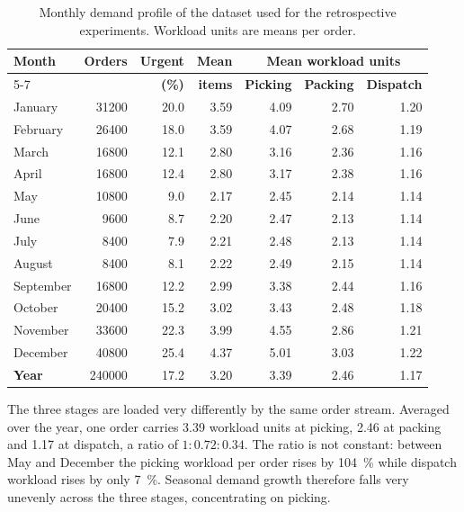 \begin{table}[htbp]
\centering
\caption[Monthly demand profile]{Monthly demand profile of the dataset used for the
retrospective experiments. Workload units are means per order.}
\label{tab:demand-profile}
\small
\begin{tabular}{lrrrrrr}
\toprule
\textbf{Month} & \textbf{Orders} & \textbf{Urgent} & \textbf{Mean} &
\multicolumn{3}{c}{\textbf{Mean workload units}} \\
\cmidrule(lr){5-7}
 & & \textbf{(\%)} & \textbf{items} & \textbf{Picking} & \textbf{Packing} & \textbf{Dispatch} \\
\midrule
January   & \num{31200} & 20.0 & 3.59 & 4.09 & 2.70 & 1.20 \\
February  & \num{26400} & 18.0 & 3.59 & 4.07 & 2.68 & 1.19 \\
March     & \num{16800} & 12.1 & 2.80 & 3.16 & 2.36 & 1.16 \\
April     & \num{16800} & 12.4 & 2.80 & 3.17 & 2.38 & 1.16 \\
May       & \num{10800} &  9.0 & 2.17 & 2.45 & 2.14 & 1.14 \\
June      & \num{9600}  &  8.7 & 2.20 & 2.47 & 2.13 & 1.14 \\
July      & \num{8400}  &  7.9 & 2.21 & 2.48 & 2.13 & 1.14 \\
August    & \num{8400}  &  8.1 & 2.22 & 2.49 & 2.15 & 1.14 \\
September & \num{16800} & 12.2 & 2.99 & 3.38 & 2.44 & 1.16 \\
October   & \num{20400} & 15.2 & 3.02 & 3.43 & 2.48 & 1.18 \\
November  & \num{33600} & 22.3 & 3.99 & 4.55 & 2.86 & 1.21 \\
December  & \num{40800} & 25.4 & 4.37 & 5.01 & 3.03 & 1.22 \\
\midrule
\textbf{Year} & \num{240000} & 17.2 & 3.20 & 3.39 & 2.46 & 1.17 \\
\bottomrule
\end{tabular}
\end{table}

The three stages are loaded very differently by the same order stream. Averaged over the year,
one order carries \num{3.39} workload units at picking, \num{2.46} at packing and \num{1.17} at
dispatch, a ratio of \(1 : 0.72 : 0.34\). The ratio is not constant: between May and December
the picking workload per order rises by \SI{104}{\percent} while dispatch workload rises by
only \SI{7}{\percent}. Seasonal demand growth therefore falls very unevenly across the three
stages, concentrating on picking.

